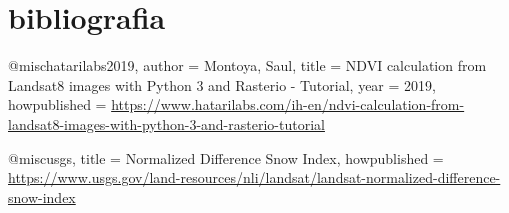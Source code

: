 \maketitle
\section{bibliografia}
{\small

@misc{hatarilabs2019,
  author = {Montoya, Saul},
  title = {NDVI calculation from Landsat8 images with Python 3 and Rasterio - Tutorial},
  year = {2019},
  howpublished = {\url{https://www.hatarilabs.com/ih-en/ndvi-calculation-from-landsat8-images-with-python-3-and-rasterio-tutorial}}
}

@misc{usgs,
  title = {Normalized Difference Snow Index},
  howpublished = {\url{https://www.usgs.gov/land-resources/nli/landsat/landsat-normalized-difference-snow-index}}
}

}